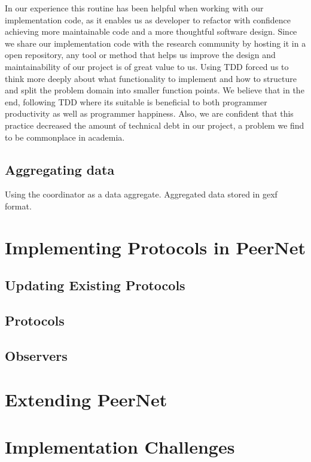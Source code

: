 In our experience this routine has been helpful when working
with our implementation code, as it enables us as developer to
refactor with confidence achieving more maintainable code and a
more thoughtful software design. Since we share our
implementation code with the research community by hosting it in
a open repository, any tool or method that helps us improve the
design and maintainability of our project is of great value to
us. Using TDD forced us to think more deeply about what
functionality to implement and how to structure and split the
problem domain into smaller function points. We believe that in
the end, following TDD where its suitable is beneficial to both
programmer productivity as well as programmer happiness. Also,
we are confident that this practice decreased the amount of
technical debt in our project, a problem we find to be commonplace in academia.

\subsection{Aggregating data}
Using the coordinator as a data aggregate. Aggregated data
stored in gexf format.

\section{Implementing Protocols in PeerNet}
\subsection{Updating Existing Protocols}
\subsection{Protocols}
\subsection{Observers}

\section{Extending PeerNet}

\section{Implementation Challenges}

